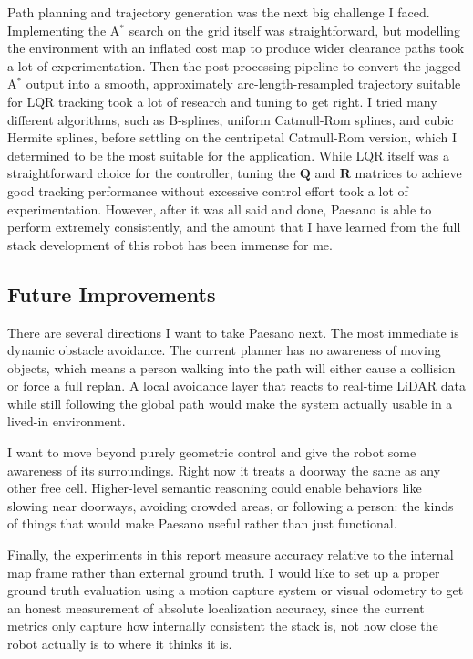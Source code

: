 \documentclass[11pt]{article}
\begin{document}
Path planning and trajectory generation was the next big challenge I faced.
Implementing the A$^{*}$ search on the grid itself was straightforward, but modelling the environment
with an inflated cost map to produce wider clearance paths
took a lot of experimentation. Then the post-processing pipeline to convert the jagged A$^{*}$ output
into a smooth, approximately arc-length-resampled trajectory suitable for LQR tracking took a lot of
research
and tuning to get right. I tried many different algorithms, such as B-splines, uniform Catmull-Rom
splines, and cubic Hermite splines, before settling on the centripetal Catmull-Rom version, which
I determined to be the most suitable for the application. While LQR itself was a straightforward choice
for the controller, tuning the $\mathbf{Q}$ and $\mathbf{R}$ matrices to achieve good tracking
performance without excessive control effort
took a lot of experimentation. However, after it was all said and done, Paesano is able to perform
extremely consistently, and the
amount that I have learned from the full stack development of this robot has been immense for me.

\subsection{Future Improvements}
There are several directions I want to take Paesano next. The most immediate is dynamic obstacle
avoidance. The current planner has no awareness of moving objects, which means a person walking 
into the path will either cause a collision or force a full replan. A local avoidance layer that 
reacts to real-time LiDAR data while still following the global path would make the system 
actually usable in a lived-in environment.

I want to move beyond purely geometric control and give the robot some 
awareness of its surroundings. Right now it treats a doorway the same as any other free cell. 
Higher-level semantic reasoning could enable behaviors like slowing near doorways, avoiding 
crowded areas, or following a person: the kinds of things that would make Paesano useful 
rather than just functional.

Finally, the experiments in this report measure accuracy relative to the internal map frame rather 
than external ground truth. I would like to set up a proper ground truth evaluation using a motion 
capture system or visual odometry to get an honest measurement of absolute localization accuracy, 
since the current metrics only capture how internally consistent the stack is, not how close the 
robot actually is to where it thinks it is.
\end{document}
